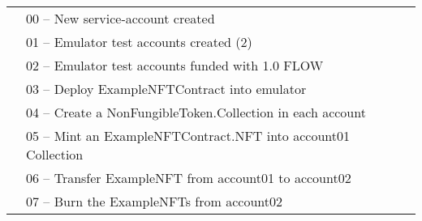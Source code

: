 \documentclass[../NFTComp_IEEE.tex]{subfiles}
\begin{document}
\begin{table}[ht]
{\begin{tabular}{lllllll}
            \multicolumn{1}{l|}{}                              & \multicolumn{6}{l|}{00 – New service-account created}                                                                                                                                                                                                                     \\ \cline{2-7}
            \multicolumn{1}{l|}{}                              & \multicolumn{6}{l|}{01 – Emulator test accounts created (2)}                                                                                                                                                                                                              \\ \cline{2-7}
            \multicolumn{1}{l|}{}                              & \multicolumn{6}{l|}{02 – Emulator test accounts funded with 1.0 FLOW}                                                                                                                                                                                                     \\ \cline{2-7}
            \multicolumn{1}{l|}{}                              & \multicolumn{6}{l|}{03 – Deploy ExampleNFTContract into emulator}                                                                                                                                                                                                         \\ \cline{2-7}
            \multicolumn{1}{l|}{}                              & \multicolumn{6}{l|}{04 – Create a NonFungibleToken.Collection in each account}                                                                                                                                                                                            \\ \cline{2-7}
            \multicolumn{1}{l|}{}                              & \multicolumn{6}{l|}{05 – Mint an ExampleNFTContract.NFT into account01 Collection}                                                                                                                                                                                        \\ \cline{2-7}
            \multicolumn{1}{l|}{}                              & \multicolumn{6}{l|}{06 – Transfer ExampleNFT from account01 to account02}                                                                                                                                                                                                 \\ \cline{2-7}
            \multicolumn{1}{l|}{}                              & \multicolumn{6}{l|}{07 – Burn the ExampleNFTs from account02}                                                                                                                                                                                                             \\ \cline{2-7}
        \end{tabular}%
    }
\end{table}
\end{document}
